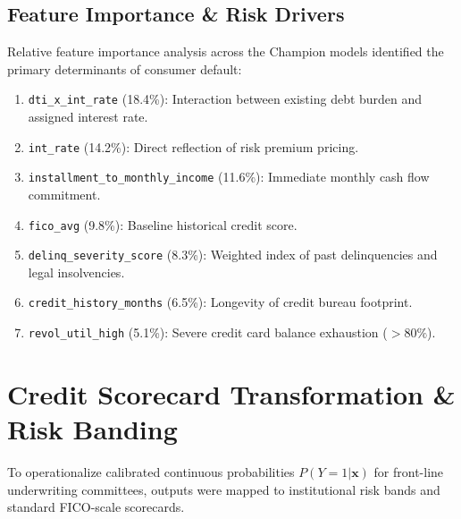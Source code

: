 \documentclass[conference]{IEEEtran}
\begin{document}
\subsection{Feature Importance \& Risk Drivers}
Relative feature importance analysis across the Champion models identified the primary determinants of consumer default:
\begin{enumerate}
    \item \texttt{dti\_x\_int\_rate} (18.4\%): Interaction between existing debt burden and assigned interest rate.
    \item \texttt{int\_rate} (14.2\%): Direct reflection of risk premium pricing.
    \item \texttt{installment\_to\_monthly\_income} (11.6\%): Immediate monthly cash flow commitment.
    \item \texttt{fico\_avg} (9.8\%): Baseline historical credit score.
    \item \texttt{delinq\_severity\_score} (8.3\%): Weighted index of past delinquencies and legal insolvencies.
    \item \texttt{credit\_history\_months} (6.5\%): Longevity of credit bureau footprint.
    \item \texttt{revol\_util\_high} (5.1\%): Severe credit card balance exhaustion ($>80\%$).
\end{enumerate}

\section{Credit Scorecard Transformation \& Risk Banding}

To operationalize calibrated continuous probabilities $P(Y=1|\mathbf{x})$ for front-line underwriting committees, outputs were mapped to institutional risk bands and standard FICO-scale scorecards.
\end{document}
